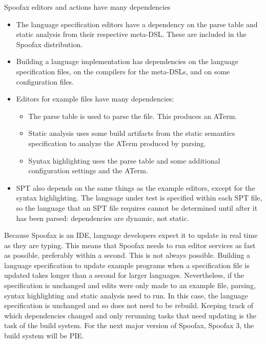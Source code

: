 Spoofax editors and actions have many dependencies 
\begin{itemize}
  \item The language specification editors have a dependency on the parse table and static analysis from their respective meta-DSL.
  These are included in the Spoofax distribution.
  \item Building a language implementation has dependencies on the language specification files, on the compilers for the meta-DSLs, and on some configuration files.
  \item Editors for example files have many dependencies:
  \begin{itemize}
    \item The parse table is used to parse the file.
    This produces an ATerm. 
    \item Static analysis uses some build artifacts from the static semantics specification to analyze the ATerm produced by parsing.
    \item Syntax highlighting uses the parse table and some additional configuration settings and the ATerm.
  \end{itemize}
  \item SPT also depends on the same things as the example editors, except for the syntax highlighting.
  The language under test is specified within each SPT file, so the language that an SPT file requires cannot be determined until after it has been parsed: dependencies are dynamic, not static.
\end{itemize}

Because Spoofax is an IDE, language developers expect it to update in real time as they are typing.
This means that Spoofax needs to run editor services as fast as possible, preferably within a second.
This is not always possible.
Building a language specification to update example programs when a specification file is updated takes longer than a second for larger languages.
Nevertheless, if the specification is unchanged and edits were only made to an example file, parsing, syntax highlighting and static analysis need to run.
In this case, the language specification is unchanged and so does not need to be rebuild.
Keeping track of which dependencies changed and only rerunning tasks that need updating is the task of the build system.
For the next major version of Spoofax, Spoofax 3, the build system will be PIE.



